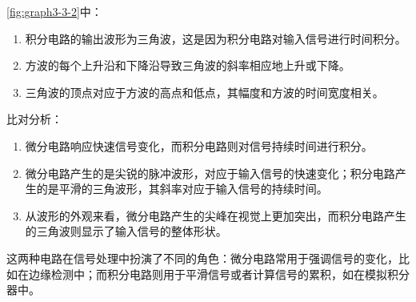 \documentclass[dvipsnames, svgnames,a4paper,11pt]{article}
\begin{document}
\begin{enumerate}
		
		\cref{fig:graph3-3-2}中：
		\begin{enumerate}
			\item 积分电路的输出波形为三角波，这是因为积分电路对输入信号进行时间积分。
			\item 方波的每个上升沿和下降沿导致三角波的斜率相应地上升或下降。
			\item 三角波的顶点对应于方波的高点和低点，其幅度和方波的时间宽度相关。
		\end{enumerate}

		
		比对分析：
		\begin{enumerate}
			\item 微分电路响应快速信号变化，而积分电路则对信号持续时间进行积分。
			\item 微分电路产生的是尖锐的脉冲波形，对应于输入信号的快速变化；积分电路产生的是平滑的三角波形，其斜率对应于输入信号的持续时间。
			\item 从波形的外观来看，微分电路产生的尖峰在视觉上更加突出，而积分电路产生的三角波则显示了输入信号的整体形状。
		\end{enumerate}

		
		这两种电路在信号处理中扮演了不同的角色：微分电路常用于强调信号的变化，比如在边缘检测中；而积分电路则用于平滑信号或者计算信号的累积，如在模拟积分器中。
	\end{enumerate}
	
\end{document}

